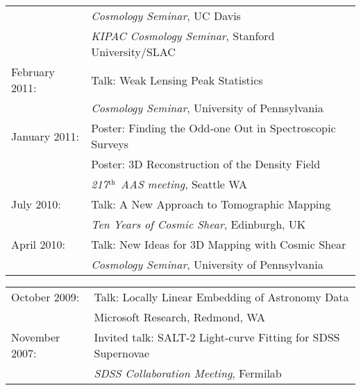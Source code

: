 {\begin{tabular}{ll}
                  & \hspace{1cm} {\it Cosmology Seminar}, UC Davis\\
                  & \hspace{1cm} {\it KIPAC Cosmology Seminar},
                    Stanford University/SLAC\\
   February 2011: & Talk: Weak Lensing Peak Statistics\\
                  & \hspace{1cm} {\it Cosmology Seminar},
                    University of Pennsylvania\\
   January 2011:  & Poster: Finding the Odd-one Out in Spectroscopic Surveys\\
                  & Poster: 3D Reconstruction of the Density Field\\
                  & \hspace{1cm} {\it 217$^{\rm th}$ AAS meeting}, Seattle WA\\
   July 2010:     & Talk: A New Approach to Tomographic Mapping\\
                  & \hspace{1cm} {\it Ten Years of Cosmic Shear},
                    Edinburgh, UK\\
   April 2010:    & Talk: New Ideas for 3D Mapping with Cosmic Shear\\
                  & \hspace{1cm} {\it Cosmology Seminar},
                    University of Pennsylvania\\
\end{tabular}
\begin{tabular}{ll}
   October 2009:  & Talk: Locally Linear Embedding of Astronomy Data\\
                  &  \hspace{1cm} Microsoft Research, Redmond, WA\\
   November 2007: & Invited talk: 
                    SALT-2 Light-curve Fitting for SDSS Supernovae\\
                  & \hspace{1cm} {\it SDSS Collaboration Meeting}, Fermilab\\
\end{tabular}\\

}
